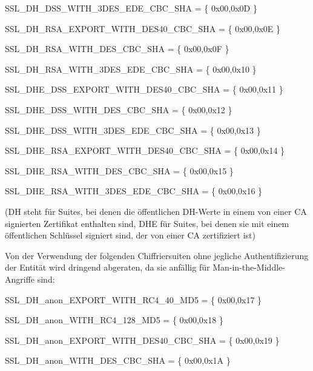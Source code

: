 \documentclass[a4paper]{article}
\begin{document}
\begin{multicols}{3}
\begin{itemize*}
\begin{itemize*}
\begin{itemize*}
                        \item SSL\_DH\_DSS\_WITH\_3DES\_EDE\_CBC\_SHA = \{ 0x00,0x0D \}
                        \item SSL\_DH\_RSA\_EXPORT\_WITH\_DES40\_CBC\_SHA = \{ 0x00,0x0E \}
                        \item SSL\_DH\_RSA\_WITH\_DES\_CBC\_SHA = \{ 0x00,0x0F \}
                        \item SSL\_DH\_RSA\_WITH\_3DES\_EDE\_CBC\_SHA = \{ 0x00,0x10 \}
                        \item SSL\_DHE\_DSS\_EXPORT\_WITH\_DES40\_CBC\_SHA = \{ 0x00,0x11 \}
                        \item SSL\_DHE\_DSS\_WITH\_DES\_CBC\_SHA = \{ 0x00,0x12 \}
                        \item SSL\_DHE\_DSS\_WITH\_3DES\_EDE\_CBC\_SHA = \{ 0x00,0x13 \}
                        \item SSL\_DHE\_RSA\_EXPORT\_WITH\_DES40\_CBC\_SHA = \{ 0x00,0x14 \}
                        \item SSL\_DHE\_RSA\_WITH\_DES\_CBC\_SHA = \{ 0x00,0x15 \}
                        \item SSL\_DHE\_RSA\_WITH\_3DES\_EDE\_CBC\_SHA = \{ 0x00,0x16 \}
                  \end{itemize*}
            \end{itemize*}
            (DH steht für Suites, bei denen die öffentlichen DH-Werte in einem von
            einer CA signierten Zertifikat enthalten sind, DHE für Suites, bei denen
            sie mit einem öffentlichen Schlüssel signiert sind, der von einer CA
            zertifiziert ist)
            \begin{itemize*}
                  \item       Von der Verwendung der folgenden Chiffriersuiten ohne jegliche
                  Authentifizierung der Entität wird dringend abgeraten, da sie anfällig
                  für Man-in-the-Middle-Angriffe sind:
                  \begin{itemize*}
                        \item SSL\_DH\_anon\_EXPORT\_WITH\_RC4\_40\_MD5 = \{ 0x00,0x17 \}
                        \item SSL\_DH\_anon\_WITH\_RC4\_128\_MD5 = \{ 0x00,0x18 \}
                        \item SSL\_DH\_anon\_EXPORT\_WITH\_DES40\_CBC\_SHA = \{ 0x00,0x19 \}
                        \item SSL\_DH\_anon\_WITH\_DES\_CBC\_SHA = \{ 0x00,0x1A \}

\end{itemize*}
\end{itemize*}
\end{itemize*}
\end{multicols}
\end{document}
